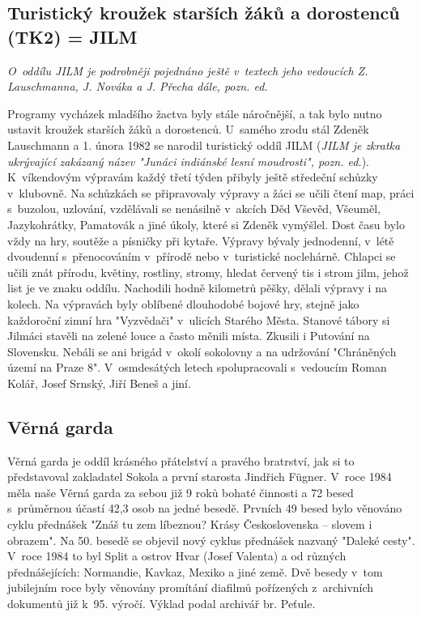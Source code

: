 \documentclass[a5paper, 11pt, twoside]{article}
\begin{document}
\subsection{Turistický kroužek starších žáků a dorostenců (TK2) =
JILM}

\textit{O~oddílu JILM je podrobněji pojednáno ještě v~textech jeho
vedoucích Z. Lauschmanna, J. Nováka a J. Přecha dále, pozn. ed.}

Programy vycházek mladšího žactva byly stále náročnější, a tak bylo
nutno ustavit kroužek starších žáků a dorostenců. U~samého zrodu stál
Zdeněk Lauschmann a 1. února 1982 se narodil turistický oddíl JILM
(\textit{JILM je zkratka ukrývající zakázaný název "Junáci indiánské lesní moudrosti", pozn. ed.}). K~víkendovým výpravám každý třetí týden
přibyly ještě středeční schůzky v~klubovně. Na schůzkách se připravovaly
výpravy a žáci se učili čtení map, práci s~buzolou, uzlování, vzdělávali
se nenásilně v~akcích Děd Vševěd, Všeuměl, Jazykohrátky, Pamatovák a
jiné úkoly, které si Zdeněk vymýšlel. Dost času bylo vždy na hry,
soutěže a písničky při kytaře. Výpravy bývaly jednodenní, v~létě
dvoudenní s~přenocováním v~přírodě nebo v~turistické noclehárně. Chlapci
se učili znát přírodu, květiny, rostliny, stromy, hledat červený tis i
strom jilm, jehož list je ve znaku oddílu. Nachodili hodně kilometrů
pěšky, dělali výpravy i na kolech. Na výpravách byly oblíbené dlouhodobé
bojové hry, stejně jako každoroční zimní hra "Vyzvědači" v~ulicích
Starého Města. Stanové tábory si Jilmáci stavěli na zelené louce a často
měnili místa. Zkusili i Putování na Slovensku. Nebáli se ani brigád
v~okolí sokolovny a na udržování "Chráněných území na Praze 8".
V~osmdesátých letech spolupracovali s~vedoucím Roman Kolář, Josef Srnský,
Jiří Beneš a jiní.

\subsection{Věrná garda}

Věrná garda je oddíl krásného přátelství a pravého bratrství, jak si to
představoval zakladatel Sokola a první starosta Jindřich Fügner. V~roce
1984 měla naše Věrná garda za sebou již 9 roků bohaté činnosti a 72
besed s~průměrnou účastí 42,3 osob na jedné besedě. Prvních 49 besed
bylo věnováno cyklu přednášek "Znáš tu zem líbeznou? Krásy
Československa -- slovem i obrazem". Na 50. besedě se objevil nový
cyklus přednášek nazvaný "Daleké cesty". V~roce 1984 to byl Split a
ostrov Hvar (Josef Valenta) a od různých přednášejících: Normandie,
Kavkaz, Mexiko a jiné země. Dvě besedy v~tom jubilejním roce byly
věnovány promítání diafilmů pořízených z~archivních dokumentů již k~95.
výročí. Výklad podal archivář br. Peťule.
\end{document}
